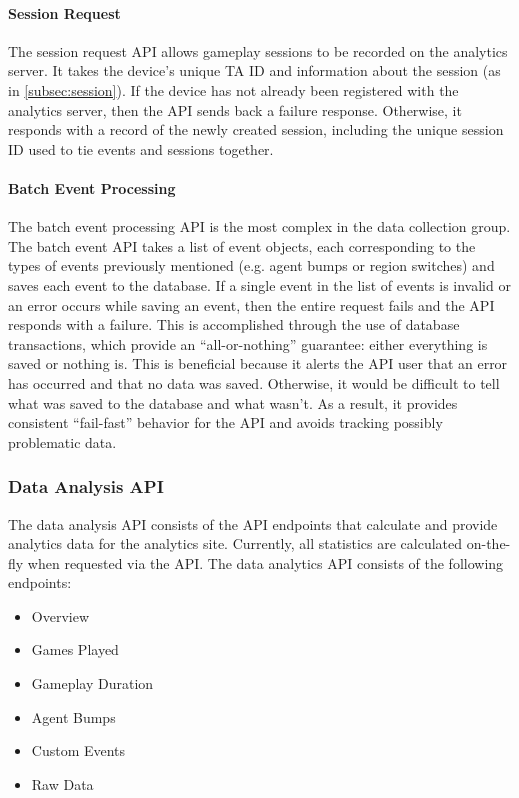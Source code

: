 \paragraph{Session Request}

The session request API allows gameplay sessions to be recorded on the analytics server. It takes the device's unique TA ID and information about the session (as in \ref{subsec:session}). If the device has not already been registered with the analytics server, then the API sends back a failure response. Otherwise, it responds with a record of the newly created session, including the unique session ID used to tie events and sessions together.

\paragraph{Batch Event Processing}

The batch event processing API is the most complex in the data collection group. The batch event API takes a list of event objects, each corresponding to the types of events previously mentioned (e.g. agent bumps or region switches) and saves each event to the database. If a single event in the list of events is invalid or an error occurs while saving an event, then the entire request fails and the API responds with a failure. This is accomplished through the use of database transactions, which provide an ``all-or-nothing'' guarantee: either everything is saved or nothing is. This is beneficial because it alerts the API user that an error has occurred and that no data was saved. Otherwise, it would be difficult to tell what was saved to the database and what wasn't. As a result, it provides consistent ``fail-fast'' behavior for the API and avoids tracking possibly problematic data.

\subsubsection{Data Analysis API}
\label{subsec:analysis_api}

The data analysis API consists of the API endpoints that calculate and provide analytics data for the analytics site. Currently, all statistics are calculated on-the-fly when requested via the API. The data analytics API consists of the following endpoints:
	\begin{itemize}
		\item Overview
		\item Games Played
		\item Gameplay Duration
		\item Agent Bumps
		\item Custom Events
		\item Raw Data
	\end{itemize}

